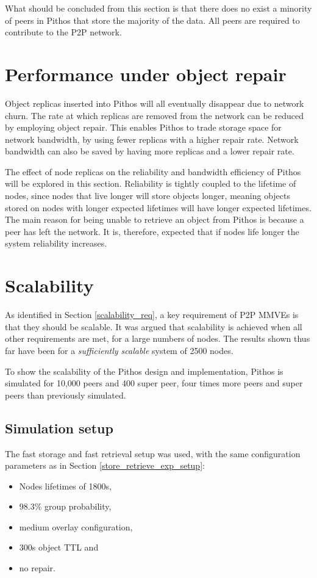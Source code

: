 What should be concluded from this section is that there does no exist a minority of peers in Pithos that store the majority of the data. All peers are required to contribute to the P2P network.

\section{Performance under object repair}
\label{repair_results}

Object replicas inserted into Pithos will all eventually disappear due to network churn. The rate at which replicas are removed from the network can be reduced by employing object repair. This enables Pithos to trade storage space for network bandwidth, by using fewer replicas with a higher repair rate. Network bandwidth can also be saved by having more replicas and a lower repair rate.

The effect of node replicas on the reliability and bandwidth efficiency of Pithos will be explored in this section. Reliability is tightly coupled to the lifetime of nodes, since nodes that live longer will store objects longer, meaning objects stored on nodes with longer expected lifetimes will have longer expected lifetimes. The main reason for being unable to retrieve an object from Pithos is because a peer has left the network. It is, therefore, expected that if nodes life longer the system reliability increases.

\section{Scalability}

As identified in Section \ref{scalability_req}, a key requirement of P2P MMVEs is that they should be scalable. It was argued that scalability is achieved when all other requirements are met, for a large numbers of nodes. The results shown thus far have been for a \emph{sufficiently scalable} system of 2500 nodes.

To show the scalability of the Pithos design and implementation, Pithos is simulated for 10,000 peers and 400 super peer, four times more peers and super peers than previously simulated.

\subsection{Simulation setup}

The fast storage and fast retrieval setup was used, with the same configuration parameters as in Section \ref{store_retrieve_exp_setup}:
%
\begin{itemize}
\item Nodes lifetimes of 1800s,
\item 98.3\% group probability,
\item medium overlay configuration,
\item 300s object TTL and
\item no repair.
\end{itemize}


